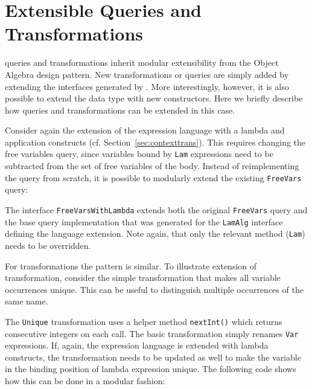 

\section{Extensible Queries and Transformations}
\label{SECT:extensible}


\noindent \name queries and transformations inherit modular
extensibility from the Object Algebra design pattern.  New
transformations or queries are simply added by extending the
interfaces generated by \name.  More interestingly, however, it is
also possible to extend the data type with new constructors.  Here we
briefly describe how queries and transformations can be extended in
this case.

Consider again the extension of the expression language with a lambda
and application constructs (cf. Section~\ref{sec:contexttrans}).  This
requires changing the free variables query, since variables bound by
\lstinline{Lam} expressions need to be subtracted from the set of free
variables of the body.  Instead of reimplementing the query from
scratch, it is possible to modularly extend the existing
\lstinline{FreeVars} query:


The interface \lstinline{FreeVarsWithLambda} extends both the original \lstinline{FreeVars} query and the base query implementation that was generated for the \lstinline{LamAlg} interface defining the language extension.
Note again, that only the relevant method (\lstinline{Lam}) needs to be overridden.


For transformations the pattern is similar.
To illustrate extension of transformation, consider the simple transformation that makes all variable occurrences unique.
This can be useful to distinguish multiple occurrences of the same name.


The \lstinline{Unique} transformation uses a helper method \lstinline{nextInt()} which returns consecutive integers on each call.
The basic transformation simply renames \lstinline{Var} expressions.
If, again, the expression language is extended with lambda constructs, the transformation needs to be updated as well to make the variable in the binding position of lambda expression unique.
The following code shows how this can be done in a modular fashion:

